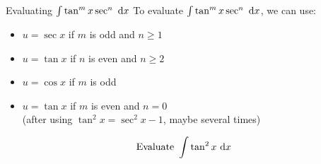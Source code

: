\begin{frame}[t]
\AnswerSpace
{}
\begin{block}{Evaluating $\int \tan^m x \sec^n ~\text{d} x$}
To evaluate $\int \tan^m x \sec^n ~\text{d} x$, we can use:
\begin{itemize}
	\item $u=\sec x$ if $m$ is odd and $n \ge 1$
	\item $u=\tan x$ if $n$ is even and $n \ge 2$
	\item \alert<1|handout:0>{$u=\cos x$ if $m$ is odd}
	\item<4-|alert@4>{$u=\tan x$ if $m$ is even and $n=0$\\ (after using $\tan^2 x = \sec^2 x - 1$, maybe several times)}
\end{itemize} 
\end{block}

\[\text{Evaluate }\int\tan^2 x\ \text{d} x\]

\end{frame}

